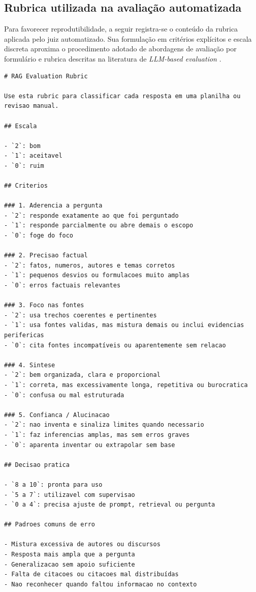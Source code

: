 \subsection{Rubrica utilizada na avaliação automatizada}

Para favorecer reprodutibilidade, a seguir registra-se o conteúdo da rubrica aplicada pelo juiz automatizado. Sua formulação em critérios explícitos e escala discreta aproxima o procedimento adotado de abordagens de avaliação por formulário e rubrica descritas na literatura de \textit{LLM-based evaluation} \parencite{liuEtAl2023geval}.

\begin{verbatim}
# RAG Evaluation Rubric

Use esta rubric para classificar cada resposta em uma planilha ou revisao manual.

## Escala

- `2`: bom
- `1`: aceitavel
- `0`: ruim

## Criterios

### 1. Aderencia a pergunta
- `2`: responde exatamente ao que foi perguntado
- `1`: responde parcialmente ou abre demais o escopo
- `0`: foge do foco

### 2. Precisao factual
- `2`: fatos, numeros, autores e temas corretos
- `1`: pequenos desvios ou formulacoes muito amplas
- `0`: erros factuais relevantes

### 3. Foco nas fontes
- `2`: usa trechos coerentes e pertinentes
- `1`: usa fontes validas, mas mistura demais ou inclui evidencias perifericas
- `0`: cita fontes incompatíveis ou aparentemente sem relacao

### 4. Sintese
- `2`: bem organizada, clara e proporcional
- `1`: correta, mas excessivamente longa, repetitiva ou burocratica
- `0`: confusa ou mal estruturada

### 5. Confianca / Alucinacao
- `2`: nao inventa e sinaliza limites quando necessario
- `1`: faz inferencias amplas, mas sem erros graves
- `0`: aparenta inventar ou extrapolar sem base

## Decisao pratica

- `8 a 10`: pronta para uso
- `5 a 7`: utilizavel com supervisao
- `0 a 4`: precisa ajuste de prompt, retrieval ou pergunta

## Padroes comuns de erro

- Mistura excessiva de autores ou discursos
- Resposta mais ampla que a pergunta
- Generalizacao sem apoio suficiente
- Falta de citacoes ou citacoes mal distribuídas
- Nao reconhecer quando faltou informacao no contexto
\end{verbatim}

